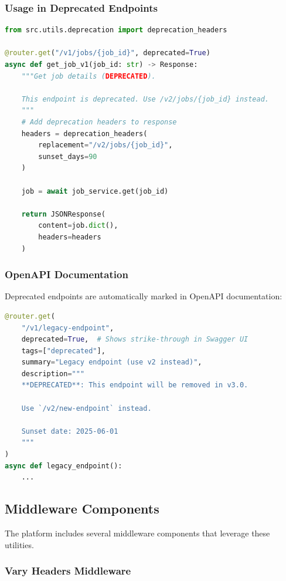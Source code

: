 \subsubsection{Usage in Deprecated Endpoints}

\begin{lstlisting}[language=Python, caption={Deprecation in endpoint implementation.}]
from src.utils.deprecation import deprecation_headers

@router.get("/v1/jobs/{job_id}", deprecated=True)
async def get_job_v1(job_id: str) -> Response:
    """Get job details (DEPRECATED).
    
    This endpoint is deprecated. Use /v2/jobs/{job_id} instead.
    """
    # Add deprecation headers to response
    headers = deprecation_headers(
        replacement="/v2/jobs/{job_id}",
        sunset_days=90
    )
    
    job = await job_service.get(job_id)
    
    return JSONResponse(
        content=job.dict(),
        headers=headers
    )
\end{lstlisting}

\subsubsection{OpenAPI Documentation}

Deprecated endpoints are automatically marked in OpenAPI documentation:

\begin{lstlisting}[language=Python, caption={OpenAPI deprecation annotation.}]
@router.get(
    "/v1/legacy-endpoint",
    deprecated=True,  # Shows strike-through in Swagger UI
    tags=["deprecated"],
    summary="Legacy endpoint (use v2 instead)",
    description="""
    **DEPRECATED**: This endpoint will be removed in v3.0.
    
    Use `/v2/new-endpoint` instead.
    
    Sunset date: 2025-06-01
    """
)
async def legacy_endpoint():
    ...
\end{lstlisting}

\subsection{Middleware Components}

The platform includes several middleware components that leverage these utilities.

\subsubsection{Vary Headers Middleware}

